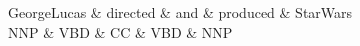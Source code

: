 \documentclass{article}
\begin{document}
\thispagestyle{empty}
\begin{center}
 \begin{dependency}[theme = default]
   \begin{deptext}[column sep=1em]
   GeorgeLucas \& directed \& and \& produced \& StarWars \\
   NNP \& VBD \& CC \& VBD \& NNP \\
   \end{deptext}
\end{dependency} \\
\end{center}
\end{document}
